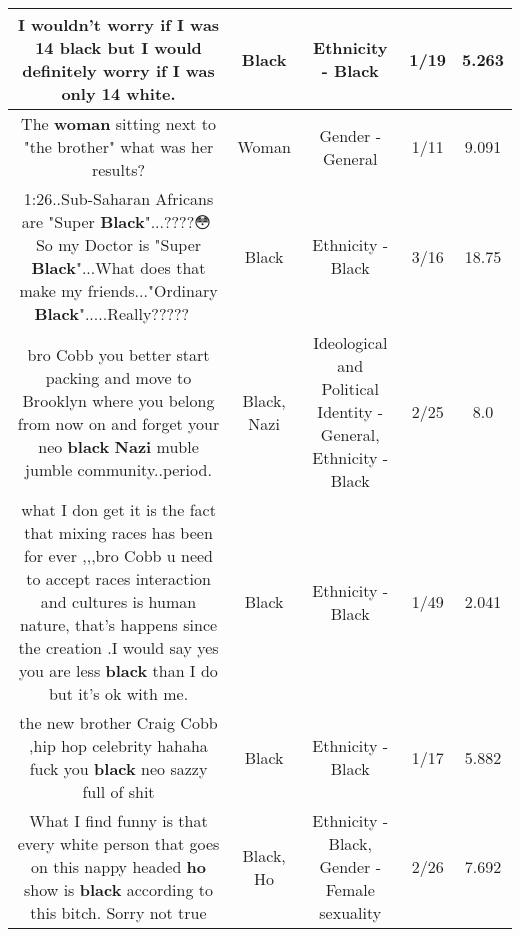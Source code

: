 \documentclass[11pt]{article}
\newlength\mylength
\begin{document}
\begin{center}
\begin{longtable}{|C{.65\mylength}|C{.30\mylength}|C{.12\mylength}|C{.12\mylength}|C{.12\mylength}|}
  \small I wouldn't worry if I was 14 \textbf{black} but I would definitely worry if I was only 14 white.\normalsize   & Black & Ethnicity - Black & 1/19 & 5.263 \\  \hline
  \small The \textbf{woman} sitting next to "the brother" what was her results?\normalsize   & Woman & Gender - General & 1/11 & 9.091 \\  \hline
  \small \@1:26..Sub-Saharan Africans are "Super \textbf{Black}"...????😳👀So my Doctor is "Super \textbf{Black}"...What does that make my friends..."Ordinary \textbf{Black}".....Really?????🤦‍♀️😒\normalsize   & Black & Ethnicity - Black & 3/16 & 18.75 \\  \hline
  \small bro Cobb you better start packing and move to Brooklyn where you belong from now on and forget your neo \textbf{black} \textbf{Nazi} muble jumble community..period.\normalsize   & Black, Nazi &  Ideological and Political Identity - General, Ethnicity - Black & 2/25 & 8.0 \\  \hline
  \small what I don get it is the fact that mixing races has been for ever ,,,bro Cobb  u need to accept races interaction and cultures is human nature, that's happens since the creation .I would say yes you are less \textbf{black} than I do but it's ok with me.\normalsize   & Black & Ethnicity - Black & 1/49 & 2.041 \\  \hline
  \small the new brother Craig Cobb ,hip hop celebrity hahaha fuck you \textbf{black} neo sazzy full of shit\normalsize   & Black & Ethnicity - Black & 1/17 & 5.882 \\  \hline
  \small What I find funny is that every white person that goes on this nappy headed \textbf{ho} show is \textbf{black} according to this bitch. Sorry not true\normalsize   & Black, Ho & Ethnicity - Black, Gender - Female sexuality & 2/26 & 7.692 \\  \hline

\end{longtable}
\end{center}
\end{document}
